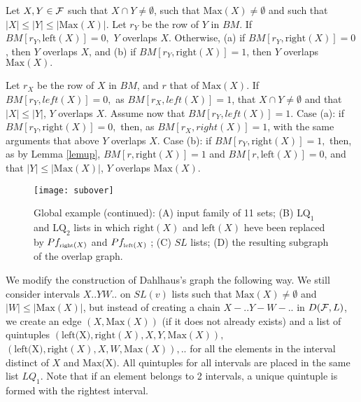 \documentclass{llncs}
\begin{document}
\begin{lemma}
Let $X,Y \in {\cal F}$ such that $X \cap Y \not= \emptyset$, such that
$\mbox{Max}(X)\not=\emptyset$ and such that $|X| \leq |Y| \leq
|\mbox{Max}(X)|.$ Let $r_Y$ be the row of $Y$ in $BM.$ If
$BM[r_Y,\mbox{left}(X)]=0,$ $Y$ overlaps $X.$ Otherwise, (a) if
$BM[r_Y,\mbox{right}(X)]=0$, then $Y$ overlaps $X$, and (b) if
$BM[r_Y,\mbox{right}(X)]=1$, then $Y$ overlaps $\mbox{Max}(X).$
\label{quintuple}
\end{lemma}
\begin{preuve}
Let $r_X$ be the row of $X$ in $BM$, and $r$ that of $\mbox{Max}(X).$
If $BM[r_Y,left(X)]=0,$ as $BM[r_X,left(X)]=1$, that $X \cap Y \not=
\emptyset$ and that $|X| \leq |Y|$, $Y$ overlaps $X$. Assume now that
$BM[r_Y,left(X)]=1.$ Case (a): if $BM[r_Y,\mbox{right}(X)]=0,$ then,
as $BM[r_X,right(X)]=1$, with the same arguments that above $Y$
overlaps $X.$ Case (b): if $BM[r_Y,\mbox{right}(X)]=1,$ then, as by
Lemma \ref{lemup}, $BM[r,\mbox{right}(X)]=1$ and
$BM[r,\mbox{left}(X)]=0$, and that $|Y| \leq |\mbox{Max}(X)|$, $Y$
overlaps $\mbox{Max}(X)$.
\end{preuve}

\begin{figure}[htb]
\vspace{-0.3cm}
  \centering
\texttt{[image: subover]}
\caption{Global example (continued): (A) input family of 11 sets; (B)
  $\mbox{LQ}_1$ and $\mbox{LQ}_2$ lists in which $\mbox{right}(X)$ and
  $\mbox{left}(X)$ heve been replaced by $Pf_{\tiny \mbox{right}(X)}$
  and $Pf_{\tiny \mbox{left}(X)}$ ; (C) $SL$ lists; (D) the resulting subgraph of
  the overlap graph.}
 \label{allexample2}
\vspace{-0.3cm}
\end{figure}


We modify the construction of Dahlhaus's graph the following way. We
still consider intervals $X..YW..$ on $SL(v)$ lists such that
$\mbox{Max}(X)\not=\emptyset$ and $|W|\leq |\mbox{Max}(X)|$, but instead
of creating a chain $X-..Y-W-..$ in $D({\cal F},L)$, we create an edge
$(X,\mbox{Max}(X))$ (if it does not already exists) and a list of
quintuples $(\mbox{left(X)},\mbox{right}(X),X,Y,\mbox{Max}(X)),$
$(\mbox{left(X)},\mbox{right}(X),X,W,\mbox{Max}(X)),..$ for all the
elements in the interval distinct of $X$ and $\mbox{Max(X)}$. All
quintuples for all intervals are placed in the same list $LQ_1$. Note
that if an element belongs to 2 intervals, a unique quintuple is
formed with the rightest interval.
\end{document}
